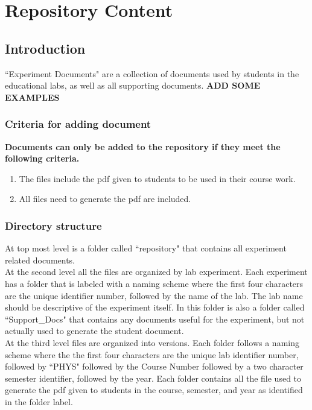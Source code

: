 \documentclass[justified]{LabArx1_5}
\begin{document}
\chapter{Repository Content}\label{chap:expDocs}

\section{Introduction}

``Experiment Documents" are a collection of documents used by students in the educational labs, as well as all supporting documents. {\bf ADD SOME EXAMPLES} \\

\subsection{Criteria for adding document}

{\bf Documents can only be added to the repository if they meet the following criteria.}
\begin{enumerate}
\item The files include the pdf given to students to be used in their course work.
\item All files need to generate the pdf are included.
\end{enumerate}

\subsection{Directory structure}

At top most level is a folder called ``repository" that contains all experiment related documents.\\

\noindent At the second level all the files are organized by lab experiment. Each experiment has a folder that is labeled with a naming scheme where the first four characters are the unique identifier number, followed by the name of the lab. The lab name should be descriptive of the experiment itself. In this folder is also a folder called ``Support\_Docs" that contains any documents useful for the experiment, but not actually used to generate the student document. \\

\noindent At the third level files are organized into versions. Each folder follows a naming scheme where the the first four characters are the unique lab identifier number, followed by ``PHYS" followed by the Course Number followed by a two character semester identifier, followed by the year. Each folder contains all the file used to generate the pdf given to students in the course, semester, and year as identified in the folder label. \\
\end{document}
